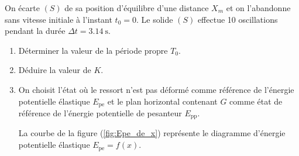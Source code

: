 On écarte $(S)$ de sa position d'équilibre d'une distance $X_{m}$ et on
l'abandonne sans vitesse initiale à l'instant $t_{0}=0$. Le solide $(S)$
effectue 10 oscillations pendant la durée $\Delta t=\qty{3,14}{\second}$.
\begin{enumerate}
    \item Déterminer la valeur de la période propre $T_{0}$.
    \item Déduire la valeur de $K$.
    \item 
          \begin{minipage}[t][][t]{0.65\linewidth}
              On choisit l'état où le ressort n'est pas déformé comme référence
              de l'énergie potentielle élastique $E_{\mathrm{pe}}$ et le plan
              horizontal contenant $G$ comme état de référence de l'énergie
              potentielle de pesanteur $E_{\mathrm{pp}}$.

              La courbe de la figure (\ref{fig:Epe_de_x}) représente le
              diagramme d'énergie potentielle élastique $E_{\mathrm{pe}}=f(x)$.
              

\end{minipage}
\end{enumerate}
